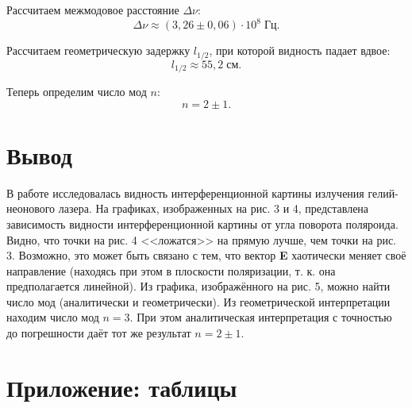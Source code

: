 \documentclass[a4paper]{article}
\begin{document}
\noindent Рассчитаем межмодовое расстояние $\Delta\nu$: $$\Delta\nu \approx (3,26 \pm 0,06) \cdot 10^{8} \; \text{Гц}.$$

\noindent Рассчитаем геометрическую задержку $l_{1/2}$, при которой видность падает вдвое: $$l_{1/2} \approx 55,2 \;\text{см}.$$

\noindent Теперь определим число мод $n$: $$n = 2 \pm 1.$$

\section{Вывод}

В работе исследовалась видность интерференционной картины излучения гелий-неонового лазера. На графиках, изображенных на рис. 3 и 4, представлена зависимость видности интерференционной картины от угла поворота поляроида. Видно, что точки на рис. 4 <<ложатся>> на прямую лучше, чем точки на рис. 3. Возможно, это может быть связано с тем, что вектор \textbf{E} хаотически меняет своё направление (находясь при этом в плоскости поляризации, т. к. она предполагается линейной). Из графика, изображённого на рис. 5, можно найти число мод (аналитически и геометрически). Из геометрической интерпретации находим число мод $n = 3$. При этом аналитическая интерпретация с точностью до погрешности даёт тот же результат $n = 2 \pm 1$.

\section{Приложение: таблицы}
\end{document}
